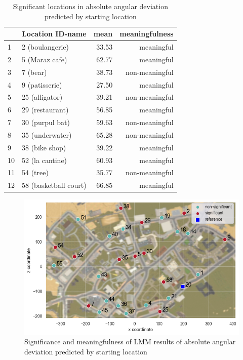 \begin{table}[h]
	\begin{center}
		\caption[Significant locations in absolute angular deviation predicted by starting location]{Significant locations in absolute angular deviation predicted by starting location} \vspace{10pt}
		\begin{tabular}{l l r r} 
			\hline 
			{} & \setrow{\bfseries} Location ID-name & \setrow{\bfseries} mean & \setrow{\bfseries} meaningfulness \\ [.7ex] 
			\hline\hline
			1 & 2 (boulangerie)		& 		33.53 		& meaningful	  \\ 
			\hline
			2 & 5 (Maraz cafe)		& 		62.77	 	& meaningful 	  \\
			\hline
			3 & 7 (bear) 			& 		38.73		& non-meaningful  \\
			\hline
			4 & 9 (patisserie) 		& 		27.50 		& meaningful	  \\
			\hline
			5 & 25 (alligator) 		& 		39.21 		& non-meaningful  \\ 
			\hline
			6 & 29 (restaurant)		& 		56.85 		& meaningful  \\ 
			\hline
			7 & 30 (purpul bat)		& 		59.63 		& non-meaningful  \\ 
			\hline
			8 & 35 (underwater)		& 		65.28 		& non-meaningful  \\
			\hline
			9 & 38 (bike shop)		& 		39.22 		& meaningful  \\
			\hline
			10 & 52 (la cantine)		& 		60.93 		& meaningful  \\
			\hline
			11 & 54 (tree)			& 		35.77 		& non-meaningful  \\
			\hline
			12 & 58 (basketball court)		& 		66.85 		& meaningful  \\ 		[1ex]
			\hline
		\end{tabular}
		\label{tab:sig_angle_loc}
	\end{center}
\end{table}

\begin{figure}[h]
	\centering
	\includegraphics[width=150mm]{figures/significance_starting_locations_angular_error_map_23.png}
	\caption[Significance and meaningfulness (absolute angular deviation predicted by starting location)]{Significance and meaningfulness of LMM results of absolute angular deviation predicted by starting location}
	\label{fig:sig_angle_loc_map}
\end{figure}

